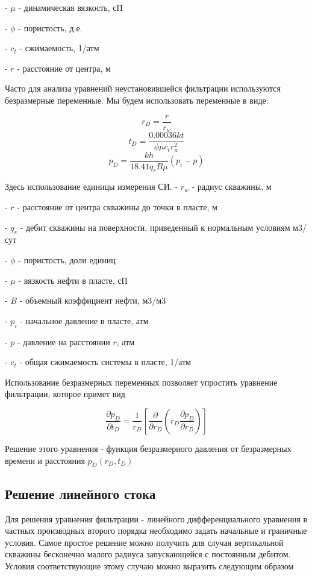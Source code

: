 \documentclass[oneside, openany]{memoir}
\begin{document}
	- $\mu$ - динамическая вязкость, сП
	
	- $\phi$ - пористость, д.е.
	
	- $c_t$ - сжимаемость, 1/атм
	
	- $r$ - расстояние от центра, м
	
	Часто для анализа уравнений неустановившейся фильтрации используются безразмерные переменные. Мы будем использовать переменные в виде:
	
	$$ r_D = \frac{r}{r_w}  $$
	$$ t_D = \frac{0.00036 kt}{\phi \mu c_t r_w^2}  $$
	$$ p_D = \frac{kh}{ 18.41 q_s B \mu} \left( p_i - p \right)   $$
	
	Здесь использование единицы измерения СИ.
	- $r_w$ - радиус скважины, м
	
	- $r$ - расстояние от центра скважины до точки в пласте, м
	
	- $q_s$ - дебит скважины на поверхности, приведенный к нормальным условиям м3/сут
	
	- $\phi$ - пористость, доли единиц
	
	- $\mu$ - вязкость нефти в пласте, сП
	
	- $B$ - объемный коэффициент нефти, м3/м3
	
	- $p_i$ - начальное давление в пласте, атм
	
	- $p$ - давление на расстоянии $r$, атм
	
	- $c_t$ - общая сжимаемость системы в пласте, 1/атм
	
	Использование безразмерных переменных позволяет упростить уравнение фильтрации, которое примет вид
	
	$$ 
	\frac{\partial p_D}{ \partial t_D} = \dfrac{1}{r_D} \left[ \dfrac{\partial}{\partial r_D} \left( r_D \dfrac{ \partial p_D} {\partial r_D} \right) \right] 
	$$
	
	Решение этого уравнения - функция безразмерного давления от безразмерных времени и расстояния $p_D(r_D, t_D) $
	
	\subsection{Решение линейного стока} 
	
	Для решения уравнения фильтрации - линейного дифференциального уравнения в частных производных второго порядка необходимо задать начальные и граничные условия.
	Самое простое решение можно получить для случая вертикальной скважины бесконечно малого радиуса запускающейся с постоянным дебитом. Условия соответствующие этому случаю можно выразить следующим образом
	
\end{document}
